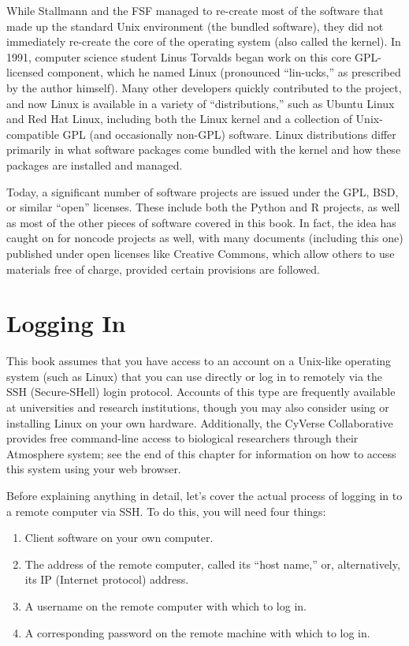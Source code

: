 \documentclass[
]{memoir}
\providecommand{\tightlist}{%
  \setlength{\itemsep}{0pt}\setlength{\parskip}{0pt}}
\begin{document}
While Stallmann and the FSF managed to re-create most of the software that made up the standard Unix environment (the bundled software), they did not immediately re-create the core of the operating system (also called the kernel). In 1991, computer science student Linus Torvalds began work on this core GPL-licensed component, which he named Linux (pronounced \enquote{lin-ucks,} as prescribed by the author himself). Many other developers quickly contributed to the project, and now Linux is available in a variety of \enquote{distributions,} such as Ubuntu Linux and Red Hat Linux, including both the Linux kernel and a collection of Unix-compatible GPL (and occasionally non-GPL) software. Linux distributions differ primarily in what software packages come bundled with the kernel and how these packages are installed and managed.

Today, a significant number of software projects are issued under the GPL, BSD, or similar \enquote{open} licenses. These include both the Python and R projects, as well as most of the other pieces of software covered in this book. In fact, the idea has caught on for noncode projects as well, with many documents (including this one) published under open licenses like Creative Commons, which allow others to use materials free of charge, provided certain provisions are followed.

\hypertarget{logging-in}{%
\chapter{Logging In}\label{logging-in}}

This book assumes that you have access to an account on a Unix-like operating system (such as Linux) that you can use directly or log in to remotely via the SSH (Secure-SHell) login protocol. Accounts of this type are frequently available at universities and research institutions, though you may also consider using or installing Linux on your own hardware. Additionally, the CyVerse Collaborative provides free command-line access to biological researchers through their Atmosphere system; see the end of this chapter for information on how to access this system using your web browser.

Before explaining anything in detail, let's cover the actual process of logging in to a remote computer via SSH. To do this, you will need four things:

\begin{enumerate}
\def\labelenumi{\arabic{enumi}.}
\tightlist
\item
  Client software on your own computer.
\item
  The address of the remote computer, called its \enquote{host name,} or, alternatively, its IP (Internet protocol) address.
\item
  A username on the remote computer with which to log in.
\item
  A corresponding password on the remote machine with which to log in.
\end{enumerate}
\end{document}

